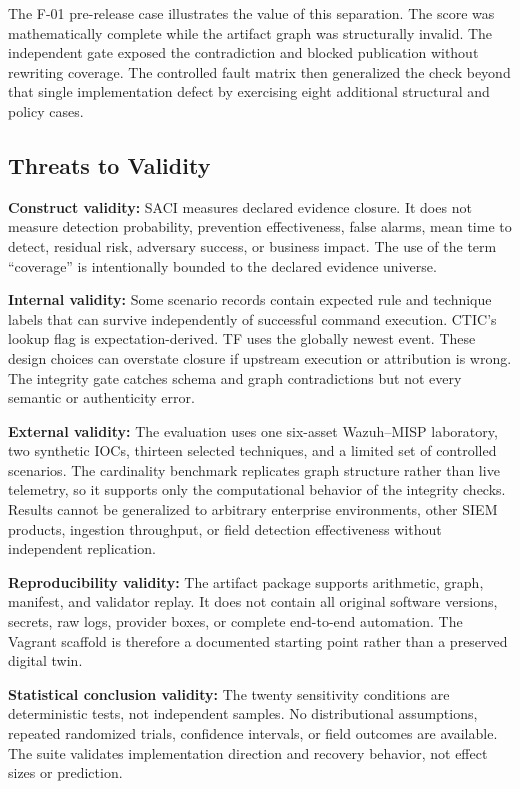 \documentclass[a4paper,conference]{IEEEtran}
\begin{document}
The F-01 pre-release case illustrates the value of this separation. The score was mathematically complete while the artifact graph was structurally invalid. The independent gate exposed the contradiction and blocked publication without rewriting coverage. The controlled fault matrix then generalized the check beyond that single implementation defect by exercising eight additional structural and policy cases.

\subsection{Threats to Validity}
\textbf{Construct validity:} SACI measures declared evidence closure. It does not measure detection probability, prevention effectiveness, false alarms, mean time to detect, residual risk, adversary success, or business impact. The use of the term ``coverage'' is intentionally bounded to the declared evidence universe.

\textbf{Internal validity:} Some scenario records contain expected rule and technique labels that can survive independently of successful command execution. CTIC's lookup flag is expectation-derived. TF uses the globally newest event. These design choices can overstate closure if upstream execution or attribution is wrong. The integrity gate catches schema and graph contradictions but not every semantic or authenticity error.

\textbf{External validity:} The evaluation uses one six-asset Wazuh--MISP laboratory, two synthetic IOCs, thirteen selected techniques, and a limited set of controlled scenarios. The cardinality benchmark replicates graph structure rather than live telemetry, so it supports only the computational behavior of the integrity checks. Results cannot be generalized to arbitrary enterprise environments, other SIEM products, ingestion throughput, or field detection effectiveness without independent replication.

\textbf{Reproducibility validity:} The artifact package supports arithmetic, graph, manifest, and validator replay. It does not contain all original software versions, secrets, raw logs, provider boxes, or complete end-to-end automation. The Vagrant scaffold is therefore a documented starting point rather than a preserved digital twin.

\textbf{Statistical conclusion validity:} The twenty sensitivity conditions are deterministic tests, not independent samples. No distributional assumptions, repeated randomized trials, confidence intervals, or field outcomes are available. The suite validates implementation direction and recovery behavior, not effect sizes or prediction.
\end{document}
